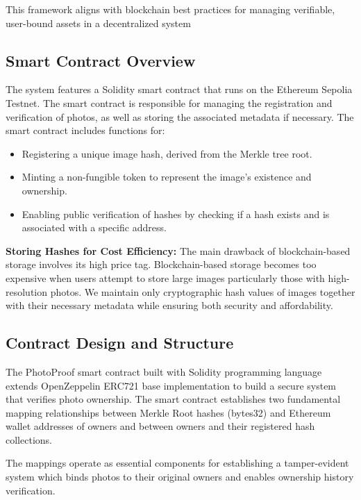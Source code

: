 This framework aligns with blockchain best practices for managing verifiable, user-bound assets in a decentralized system

\subsection{Smart Contract Overview}
The system features a Solidity smart contract that runs on the Ethereum Sepolia Testnet. The smart contract is responsible for managing the registration and verification of photos, as well as storing the associated metadata if necessary. The smart contract includes functions for:

\begin{itemize}
    \item Registering a unique image hash, derived from the Merkle tree root.
    \item Minting a non-fungible token to represent the image’s existence and ownership.
    \item Enabling public verification of hashes by checking if a hash exists and is associated with a specific address.
\end{itemize}

\textbf{Storing Hashes for Cost Efficiency: }
The main drawback of blockchain-based storage involves its high price tag. Blockchain-based storage becomes too expensive when users attempt to store large images particularly those with high-resolution photos. We maintain only cryptographic hash values of images together with their necessary metadata while ensuring both security and affordability.


\subsection{Contract Design and Structure}
The PhotoProof smart contract built with Solidity programming language extends OpenZeppelin ERC721 base implementation to build a secure system that verifies photo ownership. The smart contract establishes two fundamental mapping relationships between Merkle Root hashes (bytes32) and Ethereum wallet addresses of owners and between owners and their registered hash collections.

The mappings operate as essential components for establishing a tamper-evident system which binds photos to their original owners and enables ownership history verification.



